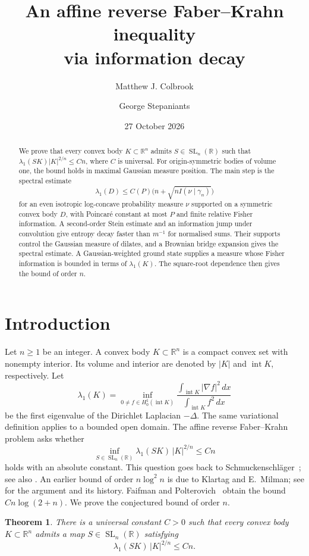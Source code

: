 \documentclass[11pt]{amsart}
\title[Affine reverse Faber--Krahn]{An affine reverse Faber--Krahn inequality\\via information decay}
\author{Matthew J. Colbrook}
\author{George Stepaniants}
\date{27 October 2026}
\numberwithin{equation}{section}
\newtheorem{theorem}{Theorem}[section]
\theoremstyle{definition}
\theoremstyle{remark}
\newcommand{\R}{\mathbb R}
\newcommand{\gam}{\gamma_n}
\DeclareMathOperator{\SL}{SL}
\DeclareMathOperator{\Int}{int}
\begin{document}
\begin{abstract}
We prove that every convex body \(K\subset\R^n\) admits
\(S\in\SL_n(\R)\) such that
\(\lambda_1(SK)|K|^{2/n}\le Cn\), where \(C\) is universal.
For origin-symmetric bodies of volume one, the bound holds in maximal
Gaussian measure position. The main step is the spectral estimate
\[
\lambda_1(D)\le C(P)\bigl(n+\sqrt{n I(\nu\mid\gam)}\bigr)
\]
for an even isotropic log-concave probability measure \(\nu\) supported on
a symmetric convex body \(D\), with Poincar\'e constant at most \(P\) and
finite relative Fisher information.
A second-order Stein estimate and an information jump under convolution
give entropy decay faster than \(m^{-1}\) for normalised sums. Their
supports control the Gaussian measure of dilates, and a Brownian bridge
expansion gives the spectral estimate. A Gaussian-weighted ground state
supplies a measure whose Fisher information is bounded in terms of
\(\lambda_1(K)\). The square-root dependence then gives the bound of
order \(n\).
\end{abstract}

\maketitle


\section{Introduction}

Let \(n\ge1\) be an integer. A convex body \(K\subset\R^n\) is a
compact convex set with nonempty interior. Its volume and interior are
denoted by \(|K|\) and \(\Int K\), respectively. Let
\[
\lambda_1(K)
=\inf_{0\ne f\in H_0^1(\Int K)}
  \frac{\int_{\Int K}|\nabla f|^2\,dx}
       {\int_{\Int K}f^2\,dx}
\]
be the first eigenvalue of the Dirichlet Laplacian \(-\Delta\).
The same variational definition applies to a bounded open domain.
The affine reverse Faber--Krahn problem asks whether
\[
\inf_{S\in\SL_n(\R)}\lambda_1(SK)\,|K|^{2/n}\le Cn
\]
holds with an absolute constant. This question goes back to
Schmuckenschl\"ager~\cite{Sch11}; see also
\cite[Conjecture~5.1]{FP26}. An earlier bound of order \(n\log^2 n\)
is due to Klartag and E.~Milman; see
\cite[Proposition~4.8]{BK26} for the argument and its history.
Faifman and Polterovich~\cite[Theorem~5.2]{FP26} obtain the bound
\(Cn\log(2+n)\). We prove the conjectured bound of order \(n\).

\begin{theorem}\label{thm:affine-main}
There is a universal constant \(C>0\) such that every convex body
\(K\subset\R^n\) admits a map \(S\in\SL_n(\R)\) satisfying
\[
\lambda_1(SK)\,|K|^{2/n}\le Cn.
\]
\end{theorem}
\end{document}
